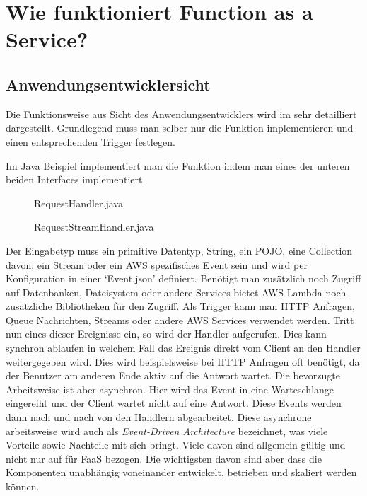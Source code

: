 \documentclass[12pt, a4paper]{article}
\begin{document}
\section{Wie funktioniert Function as a Service?}
\subsection{Anwendungsentwicklersicht}
Die Funktionsweise aus Sicht des Anwendungsentwicklers wird im \cite[Developer Guide von \ac{AWS}]{awsLambda_devGuide} sehr detailliert dargestellt.
Grundlegend muss man selber nur die Funktion implementieren und einen entsprechenden Trigger festlegen.

Im Java Beispiel implementiert man die Funktion indem man eines der unteren beiden Interfaces implementiert.

\begin{figure}[h]
    
    \caption{RequestHandler.java}
\end{figure}

\begin{figure}[h]
    
    \caption{RequestStreamHandler.java}
\end{figure}

Der Eingabetyp muss ein primitive Datentyp, String, ein \ac{POJO}, eine Collection davon, ein Stream oder ein AWS spezifisches Event sein und wird per Konfiguration in einer `Event.json' definiert.
Benötigt man zusätzlich noch Zugriff auf Datenbanken, Dateisystem oder andere Services bietet \ac{AWS} Lambda noch zusätzliche Bibliotheken für den Zugriff.
\newline\newline
Als Trigger kann man HTTP Anfragen, Queue Nachrichten, Streams oder andere \ac{AWS} Services verwendet werden.
Tritt nun eines dieser Ereignisse ein, so wird der Handler aufgerufen.
Dies kann synchron ablaufen in welchem Fall das Ereignis direkt vom Client an den Handler weitergegeben wird.
Dies wird beispielsweise bei HTTP Anfragen oft benötigt, da der Benutzer am anderen Ende aktiv auf die Antwort wartet.
\newline
Die bevorzugte Arbeitsweise ist aber asynchron.
Hier wird das Event in eine Warteschlange eingereiht und der Client wartet nicht auf eine Antwort.
Diese Events werden dann nach und nach von den Handlern abgearbeitet.
Diese asynchrone arbeitsweise wird auch als \emph{Event-Driven Architecture} bezeichnet, was viele Vorteile sowie Nachteile mit sich bringt\cite{awsEventDrivenArchitecture}.
Viele davon sind allgemein gültig und nicht nur auf für \ac{FaaS} bezogen.
Die wichtigsten davon sind aber dass die Komponenten unabhängig voneinander entwickelt, betrieben und skaliert werden können.
\end{document}
